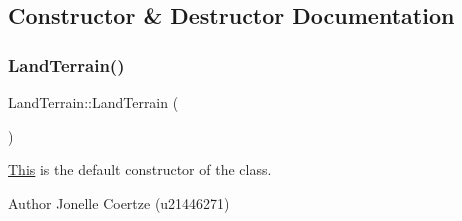 \subsection{Constructor \& Destructor Documentation}
\mbox{\label{class_land_terrain_a9c0220a84230c24b9c18d7c7ab8a4dde}} 
\subsubsection{\texorpdfstring{LandTerrain()}{LandTerrain()}}
{\footnotesize\ttfamily Land\+Terrain\+::\+Land\+Terrain (\begin{DoxyParamCaption}{ }\end{DoxyParamCaption})}



\mbox{\hyperlink{class_this}{This}} is the default constructor of the class. 

\begin{DoxyAuthor}{Author}
Jonelle Coertze (u21446271) 
\end{DoxyAuthor}
